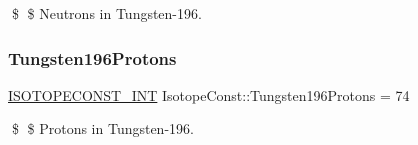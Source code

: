 \$ \$ Neutrons in Tungsten-\/196. \mbox{\label{group___isotope_const-_tungsten-_w196_ga72644510aff9b38582b800a9c5c9fde2}} 
\subsubsection{\texorpdfstring{Tungsten196\+Protons}{Tungsten196Protons}}
{\footnotesize\ttfamily \mbox{\hyperlink{group___isotope_const-_macros_ga5f18360b3e99483a35c32d789e62621c}{I\+S\+O\+T\+O\+P\+E\+C\+O\+N\+S\+T\+\_\+\+I\+NT}} Isotope\+Const\+::\+Tungsten196\+Protons = 74}

\$ \$ Protons in Tungsten-\/196. 